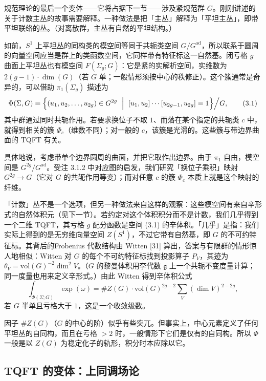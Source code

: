 规范理论的最后一个变体——它将占据下一节——涉及紧规范群 $G$。刚刚讲述的关于计数主丛的故事需要解释。一种做法是把「主丛」解释为「平坦主丛」，即带平坦联络的丛。（对离散群，主丛有自然的平坦结构。）

如前，$S^1$ 上平坦丛的同构类的模空间等同于共轭类空间 $G/G^{\mathrm{ad}}$，所以联系于圆周的向量空间应当是群上的类函数空间，它同样带有特征标这一自然基。闭亏格 $g$ 曲面上平坦丛也有模空间 $F(\Sigma_g;G)$：它是紧的实解析空间，实维数为 $2(g-1)\cdot\dim(G)$（若 $G$ 单；一般情形须按中心的秩修正）。这个簇通常是奇异的，可以借助 $\pi_1(\Sigma_g)$ 描述为
\begin{equation}
\Phi(\Sigma,G)=\Bigl\{(u_1,u_2,\dots,u_{2g})\in G^{2g}\ \Bigm|\ [u_1,u_2]\cdots[u_{2g-1},u_{2g}]=1\Bigr\}\Big/ G,
\tag{3.1}\label{eq:3.1}
\end{equation}
其中群通过同时共轭作用。若要求换位子不取 $1$、而落在某个指定的共轭类 $c$ 中，就得到相关的簇 $\Phi_c$（维数不同）；对一般的 $c$，该簇是光滑的。这些簇与带边界曲面的 TQFT 有关。

具体地说，考虑带单个边界圆周的曲面，并把它取作出边界。由于 $\pi_1$ 自由，模空间是 $G^{2g}/G^{\mathrm{ad}}$。受注 3.1.2 中对应图的启发，我们研究「换位子乘积」映射 $G^{2g}\to G$（它对 $G$ 的共轭作用等变）；而对任意 $c$ 的簇 $\Phi_c$ 本质上就是这个映射的纤维。

「计数」丛不是一个选项，但另一种做法来自这样的观察：这些模空间有来自辛形式的自然体积元（见下一节）。若约定对这个体积积分而不是计数，我们几乎得到一个二维 TQFT，其亏格 $g$ 配分函数是空间 (3.1) 的辛体积。「几乎」是指：我们实际上得到的是无穷维向量空间 $Z(S^1)$，不过它带有自然基，即 $G$ 的不可约特征标。其背后的Frobenius 代数结构由 Witten [31] 算出，答案与有限群的情形惊人地相似：Witten 对 $G$ 的每个不可约特征标找到投影算子 $P_V$，其迹为 $\theta_V=\mathrm{vol}(G)^{-2}\dim^2V$。（$G$ 的黎曼体积用李代数 $\mathfrak{g}$ 上一个共轭不变度量计算；同一度量也用来定义辛形式。）由此 Witten 得到辛体积公式
\[
\int_{\Phi(\Sigma;G)}\exp(\omega)=\#Z(G)\cdot\mathrm{vol}(G)^{2g-2}\sum_V(\dim V)^{2-2g},
\]
若 $G$ 半单且亏格大于 $1$，这是一个收敛级数。

\begin{remark}
因子 $\#Z(G)$（$G$ 的中心的阶）似乎有些突兀。但事实上，中心元素定义了任何平坦丛的自同构，而且在亏格 $>2$ 时，一般情形下它们是仅有的自同构。所以 $\Phi$ 一般是以 $Z(G)$ 为稳定化子的轨形，积分时本应除以它。
\end{remark}

\subsection{TQFT 的变体：上同调场论}

